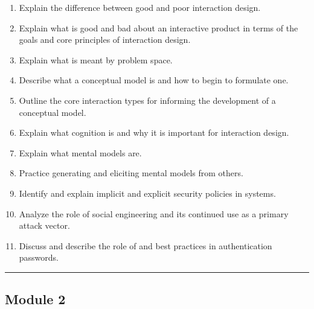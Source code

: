 \documentclass[]{article}
\providecommand{\tightlist}{%
  \setlength{\itemsep}{0pt}\setlength{\parskip}{0pt}}
\begin{document}
\begin{enumerate}
\def\labelenumi{\arabic{enumi}.}
\tightlist
\item
  Explain the difference between good and poor interaction design.
\item
  Explain what is good and bad about an interactive product in terms of
  the goals and core principles of interaction design.
\item
  Explain what is meant by problem space.
\item
  Describe what a conceptual model is and how to begin to formulate one.
\item
  Outline the core interaction types for informing the development of a
  conceptual model.
\item
  Explain what cognition is and why it is important for interaction
  design.
\item
  Explain what mental models are.
\item
  Practice generating and eliciting mental models from others.
\item
  Identify and explain implicit and explicit security policies in
  systems.
\item
  Analyze the role of social engineering and its continued use as a
  primary attack vector.
\item
  Discuss and describe the role of and best practices in authentication
  passwords.
\end{enumerate}

\begin{center}\rule{0.5\linewidth}{\linethickness}\end{center}

\hypertarget{module-2}{%
\subsection{Module 2}\label{module-2}}
\end{document}
